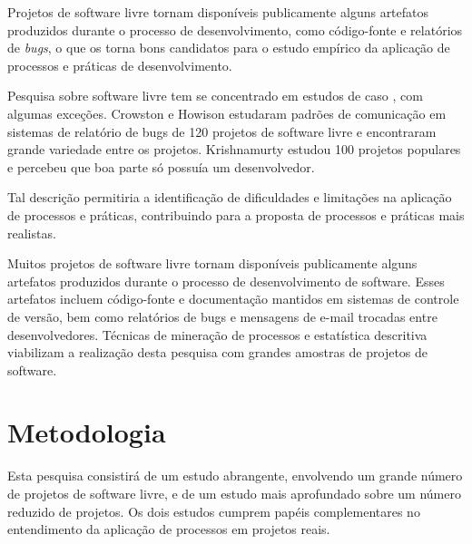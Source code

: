 \documentclass{article}
\begin{document}
Projetos de software livre tornam disponíveis publicamente alguns artefatos
produzidos durante o processo de desenvolvimento, como código-fonte e relatórios
de \emph{bugs}, o que os torna bons candidatos para o estudo empírico da
aplicação de processos e práticas de desenvolvimento.

Pesquisa sobre software livre tem se concentrado em estudos de caso
\cite{mockus2002,capiluppi2007}, com algumas exceções. Crowston e Howison
\cite{crowston2005} estudaram padrões de comunicação em sistemas de relatório de
bugs de 120 projetos de software livre e encontraram grande variedade entre os
projetos. Krishnamurty \cite{krishnamurthy2002} estudou 100 projetos populares e
percebeu que boa parte só possuía um desenvolvedor.


Tal descrição permitiria a identificação de dificuldades e limitações na
aplicação de processos e práticas, contribuindo para a proposta de processos e
práticas mais realistas.

Muitos projetos de software livre tornam disponíveis publicamente alguns
artefatos produzidos durante o processo de desenvolvimento de software. Esses
artefatos incluem código-fonte e documentação mantidos em sistemas de controle
de versão, bem como relatórios de bugs e mensagens de e-mail trocadas entre
desenvolvedores. Técnicas de mineração de processos e estatística descritiva
viabilizam a realização desta pesquisa com grandes amostras de projetos de
software.


\section{Metodologia}

Esta pesquisa consistirá de um estudo abrangente, envolvendo um grande número
de projetos de software livre, e de um estudo mais aprofundado sobre um número
reduzido de projetos. Os dois estudos cumprem papéis complementares no
entendimento da aplicação de processos em projetos reais.
\end{document}
